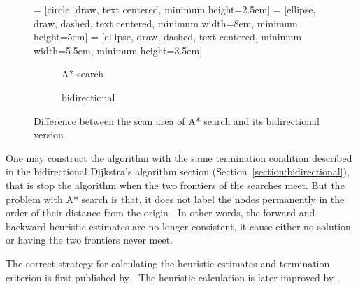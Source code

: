 \begin{figure}[H]
     = [circle, draw, text centered, minimum height=2.5em]
     = [ellipse, draw, dashed, text centered, minimum width=8em, minimum height=5em]
     = [ellipse, draw, dashed, text centered, minimum width=5.5em, minimum height=3.5em]
    \centering
    \begin{subfigure}[t]{.4\textwidth}
        \centering
        \caption{A* search}
    \end{subfigure}
    \begin{subfigure}[t]{.4\textwidth}
        \centering
        \caption{bidirectional}
    \end{subfigure}
    \caption{Difference between the scan area of A* search and its bidirectional version}
    \label{fig:bidirectdiff}
\end{figure}

One may construct the algorithm with the same termination condition described in the bidirectional Dijkstra's algorithm section (Section~\ref{section:bidirectional}),
that is stop the algorithm when the two frontiers of the searches meet.
But the problem with A* search is that, it does not label the nodes permanently in the order of their distance from the origin \citep{Klunder}.
In other words, the forward and backward heuristic estimates are no longer consistent,
it cause either no solution or having the two frontiers never meet.

The correct strategy for calculating the heuristic estimates and termination criterion is first published by \citet{Pohl}.
The heuristic calculation is later improved by \citet{Ikeda}.

